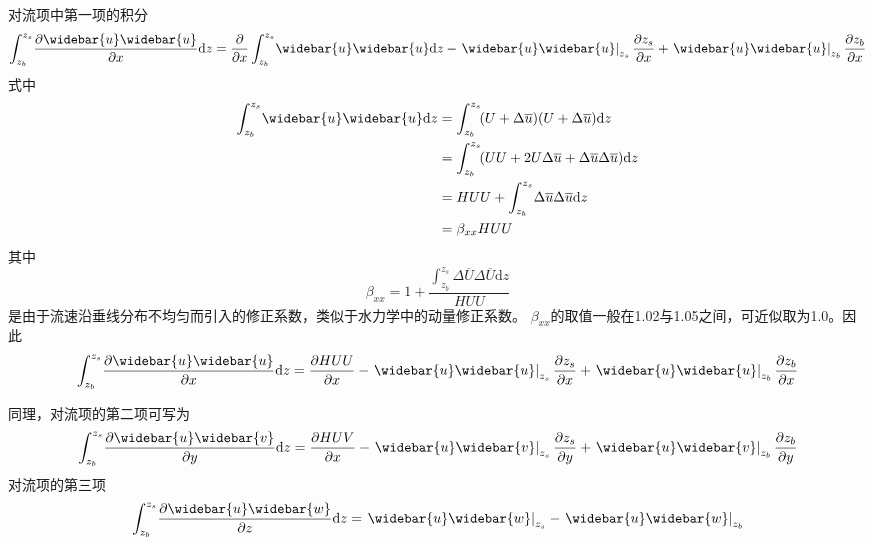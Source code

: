 对流项中第一项的积分
\begin{equation}
  \int_{z_{b}}^{ z_{s}}\!
  \frac{\partial \widebar{u}\widebar{u}}{\partial x}
  \mathrm{d}z
  =
  \frac{\partial}{\partial x}
  \int_{z_{b}}^{ z_{s}}\!
  \widebar{u}\widebar{u}
  \mathrm{d}z
  -
  \left.\widebar{u}\widebar{u}\right|_{z_{s}}\frac{\partial  z_{s}}{\partial x}
  +
  \left.\widebar{u}\widebar{u}\right|_{z_{b}}\frac{\partial z_{b}}{\partial x}
  \label{EqCGe_CT_1st}
\end{equation}
式中
\begin{equation*}
  \begin{aligned}
    \int_{z_{b}}^{ z_{s}}\!
    \widebar{u}\widebar{u}
    \mathrm{d}z
    &=
    \int_{z_{b}}^{ z_{s}}\!
    (U+\Delta\overline{u})(U+\Delta\overline{u})
    \mathrm{d}z
    \\
    &=
    \int_{z_{b}}^{ z_{s}}\!
    (UU+2U\Delta\overline{u}+\Delta\overline{u}\Delta\overline{u})
    \mathrm{d}z
    \\
    &=
    HUU
    +
    \int_{z_{b}}^{ z_{s}}\!
    \Delta\overline{u}\Delta\overline{u}
    \mathrm{d}z
    \\
    &=
    \beta_{xx}HUU
  \end{aligned}
\end{equation*}
其中
\begin{equation}
  \beta_{xx}
  =
  1 +
  \frac
  {
    \int_{z_{b}}^{ z_{s}}\!
    \Delta\overline{U}\Delta\overline{U}
    \mathrm{d}z
  }
  {HUU}
\end{equation}
是由于流速沿垂线分布不均匀而引入的修正系数，类似于水力学中的动量修正系数。
$\beta_{xx}$的取值一般在1.02与1.05之间，可近似取为1.0。因此
\begin{equation}
  \int_{z_{b}}^{ z_{s}}\!
  \frac{\partial \widebar{u}\widebar{u}}{\partial x}
  \mathrm{d}z
  =
  \frac{\partial HUU}{\partial x}
  -
  \left.\widebar{u}\widebar{u}\right|_{z_{s}}\frac{\partial  z_{s}}{\partial x}
  +
  \left.\widebar{u}\widebar{u}\right|_{z_{b}}\frac{\partial z_{b}}{\partial x}
\end{equation}

同理，对流项的第二项可写为
\begin{equation}
  \int_{z_{b}}^{ z_{s}}\!
  \frac{\partial \widebar{u}\widebar{v}}{\partial y}
  \mathrm{d}z
  =
  \frac{\partial HUV}{\partial x}
  -
  \left.\widebar{u}\widebar{v}\right|_{z_{s}}\frac{\partial  z_{s}}{\partial y}
  +
  \left.\widebar{u}\widebar{v}\right|_{z_{b}}\frac{\partial z_{b}}{\partial y}
\end{equation}
对流项的第三项
\begin{equation}
  \int_{z_{b}}^{ z_{s}}\!
  \frac{\partial \widebar{u}\widebar{w}}{\partial z}
  \mathrm{d}z
  =
  \left.\widebar{u}\widebar{w}\right|_{z_{s}}
  -
  \left.\widebar{u}\widebar{w}\right|_{z_{b}}
\end{equation}


